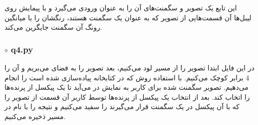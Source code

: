 \documentclass[a4paper,12pt]{article}
\begin{document}
	\subsubsection*{}
	این تابع یک تصویر و سگمنت‌های آن را به عنوان ورودی می‌گیرد و با پیمایش روی لیبل‌ها آن قسمت‌هایی از تصویر که به عنوان یک سگمنت هستند، رنگشان را با میانگین رونگ آن سگمنت جایگزین می‌کند.
	\subsubsection*{$\circ$ q4.py}
	در این فایل ابتدا تصویر 
	را از مسیر
	لود می‌کنیم، بعد تصویر را به فضای 
	می‌بریم و آن را 4 برابر کوچک می‌کنیم. با استفاده روش 
	که در کتابخانه 
	پیاده‌سازی شده است 
	را انجام می‌دهیم. تصویر سگمنت شده برای کاربر به نمایش در می‌آید تا یک پیکسل از پرنده‌ها را اتخاب کند. بعد از انتخاب یک پیکسل از پرنده‌ها توسط کاربر آن قسمت از تصویر را که با آن پیکسل در یک سگمنت قرار می‌گیرند را سفید می‌کنیم و نتیجه را با نام 
	در مسیر
	ذخیره می‌کنیم.
	
	
\end{document}
